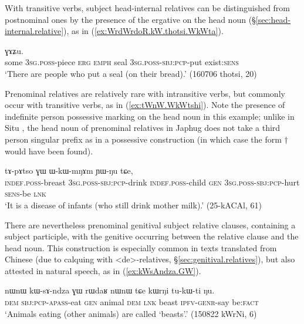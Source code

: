 With transitive verbs, subject head-internal relatives can be distinguished from postnominal ones by the presence of the ergative  on the head noun (§\ref{sec:head-internal.relative}), as in (\ref{ex:WrdWrdoR.kW.thotsi.WkWta}).

\begin{exe}
\ex \label{ex:WrdWrdoR.kW.thotsi.WkWta}
  ɣɤʑu. \\
 some \textsc{3sg}.\textsc{poss}-piece \textsc{erg} \textsc{emph} seal \textsc{3sg}.\textsc{poss}-\textsc{sbj}:\textsc{pcp}-put exist:\textsc{sens} \\
 \glt `There are people who put a seal (on their bread).' (160706 thotsi, 20)
\end{exe}

Prenominal relatives are relatively rare with intransitive verbs, but commonly occur with transitive verbs, as in (\ref{ex:tWnW.WkWtshi}). Note the presence of indefinite person possessive marking on the head noun  in this example; unlike in Situ \citep{jacksonlin07}, the head noun of prenominal relatives in Japhug does not take a third person singular prefix as in a possessive construction (in which case the form $\dagger$ would have been found).

\begin{exe}
\ex \label{ex:tWnW.WkWtshi}
 \gll  [tɯ-nɯ ɯ-kɯ-tsʰi] tɤ-pɤtso ɣɯ ɯ-kɯ-mŋɤm ɲɯ-ŋu tɕe, \\
 \textsc{indef}.\textsc{poss}-breast \textsc{3sg}.\textsc{poss}-\textsc{sbj}:\textsc{pcp}-drink \textsc{indef}.\textsc{poss}-child \textsc{gen} \textsc{3sg}.\textsc{poss}-\textsc{sbj}:\textsc{pcp}-hurt \textsc{sens}-be \textsc{lnk} \\
 \glt `It is a disease of infants (who still drink mother milk).' (25-kACAl, 61)
\end{exe}

There are nevertheless prenominal genitival subject relative clauses, containing a subject participle, with the genitive  occurring between the relative clause and the head noun. This construction is especially common in texts translated from Chinese (due to calquing with  <de>-relatives, §\ref{sec:genitival.relatives}), but also attested in natural speech, as in (\ref{ex:kWsAndza.GW}).

\begin{exe}
\ex \label{ex:kWsAndza.GW}
 \gll nɯnɯ kɯ-sɤ-ndza ɣɯ rɯdaʁ nɯnɯ tɕe kɯrŋi tu-kɯ-ti ŋu.  \\
 \textsc{dem} \textsc{sbj}:\textsc{pcp}-\textsc{apass}-eat \textsc{gen} animal \textsc{dem} \textsc{lnk} beast \textsc{ipfv}-\textsc{genr}-say be:\textsc{fact} \\
 \glt `Animals eating (other animals) are called `beasts'.' (150822 kWrNi, 6)
\end{exe}

